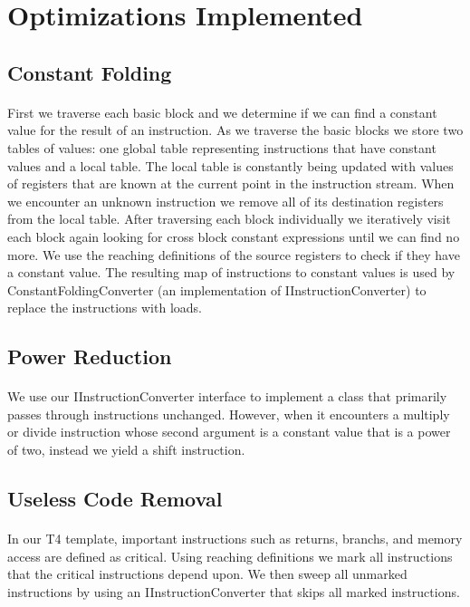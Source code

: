 \documentclass[12pt]{article}
\begin{document}
\section{Optimizations Implemented}

\subsection{Constant Folding}
\paragraph{}
First we traverse each basic block and we determine if we can find a constant value for the result of an instruction.
As we traverse the basic blocks we store two tables of values: one global table representing instructions that have constant values and a local table.
The local table is constantly being updated with values of registers that are known at the current point in the instruction stream.
When we encounter an unknown instruction we remove all of its destination registers from the local table.
After traversing each block individually we iteratively visit each block again looking for cross block constant expressions until we can find no more.
We use the reaching definitions of the source registers to check if they have a constant value.
The resulting map of instructions to constant values is used by ConstantFoldingConverter (an implementation of IInstructionConverter) to replace the instructions with loads.

\subsection{Power Reduction}
\paragraph{}
We use our IInstructionConverter interface to implement a class that primarily passes through instructions unchanged.
However, when it encounters a multiply or divide instruction whose second argument is a constant value that is a power of two, instead we yield a shift instruction.

\subsection{Useless Code Removal}
\paragraph{}
In our T4 template, important instructions such as returns, branchs, and memory access are defined as critical.
Using reaching definitions we mark all instructions that the critical instructions depend upon.
We then sweep all unmarked instructions by using an IInstructionConverter that skips all marked instructions.
\end{document}
